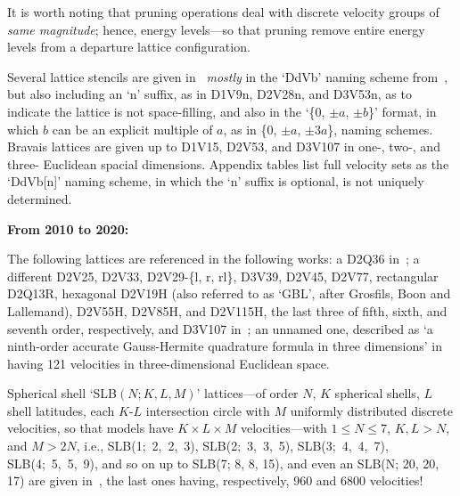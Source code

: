     It is worth noting that pruning operations deal with discrete  velocity  groups  of  \emph{same  magnitude};  hence,  energy
    levels---so that pruning remove entire energy levels from a departure lattice configuration.

    Several lattice stencils are  given  in~\cite{2009-SurmasR+PhilippiPC-EurPhysJSpecialTopics}  \emph{mostly}  in  the  `DdVb'
    naming scheme from~\cite{2006-PhilippiPC+SurmasR-PhysRevE}, but also including an `n'  suffix,  as  in  D1V9n,  D2V28n,  and
    D3V53n, as to indicate the lattice is not space-filling, and also in the `\{$0$, $\pm a$, $\pm b$\}' format,  in  which  $b$
    can be an explicit multiple of $a$, as in \{$0$, $\pm a$, $\pm 3a$\}, naming schemes.  Bravais  lattices  are  given  up  to
    D1V15, D2V53, and D3V107 in one-, two-, and three- Euclidean spacial dimensions. Appendix tables list full velocity sets  as
    the `DdVb[n]' naming scheme, in which the `n' suffix is optional, is not uniquely determined.


    \vspace{2.0mm}\noindent\textbf{From 2010 to 2020:}\vspace{1.0mm}

    The      following      lattices      are      referenced      in       the       following       works:       a       D2Q36
    in~\cite[p.~452]{2010-AidunCK+ClausenJR-AnnuRevFluidMech}; a different D2V25,  D2V33,  D2V29-\{l,  r,  rl\},  D3V39,  D2V45,
    D2V77, rectangular D2Q13R, hexagonal D2V19H (also referred to as `GBL', after Grosfils, Boon and Lallemand), D2V55H, D2V85H,
    and D2V115H, the last three of fifth, sixth, and seventh order, respectively, and D3V107 in~\cite{2010-HegeleLA-DrUFSC};  an
    unnamed  one,  described  as   `a   ninth-order   accurate   Gauss-Hermite   quadrature   formula   in   three   dimensions'
    in~\cite{2008-NieX+ChenH-PhysRevE} having 121 velocities in three-dimensional Euclidean space.

    Spherical shell `SLB$(N; K, L, M)$' lattices---of order $N$,  $K$  spherical  shells,  $L$  shell  latitudes,  each  $K$-$L$
    intersection circle with $M$ uniformly distributed  discrete  velocities,  so  that  models  have  $K  \times  L  \times  M$
    velocities---with $1 \leqslant N \leqslant  7$,  $K,  L  >  N$,  and  $M  >  2N$,  i.e.,  SLB(1;~2,~2,~3),  SLB(2;~3,~3,~5),
    SLB(3;~4,~4,~7), SLB(4;~5,~5,~9), and so  on  up  to  SLB(7;  8,  8,  15),  and  even  an  SLB(N;  20,  20,  17)  are  given
    in~\cite{2012-AmbrusVE+SofoneaV-PhysRevE}, the last ones having, respectively, 960 and 6800 velocities!

